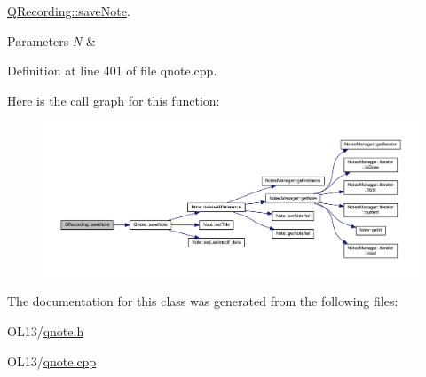 \hyperlink{class_q_recording_a37492f3dbda2dad2a8cd62012fe91b78}{Q\+Recording\+::save\+Note}. 


\begin{DoxyParams}{Parameters}
{\em N} & \\
\hline
\end{DoxyParams}


Definition at line 401 of file qnote.\+cpp.

Here is the call graph for this function\+:\nopagebreak
\begin{figure}[H]
\begin{center}
\leavevmode
\includegraphics[width=350pt]{class_q_recording_a37492f3dbda2dad2a8cd62012fe91b78_cgraph}
\end{center}
\end{figure}


The documentation for this class was generated from the following files\+:\begin{DoxyCompactItemize}
\item 
O\+L13/\hyperlink{qnote_8h}{qnote.\+h}\item 
O\+L13/\hyperlink{qnote_8cpp}{qnote.\+cpp}\end{DoxyCompactItemize}
